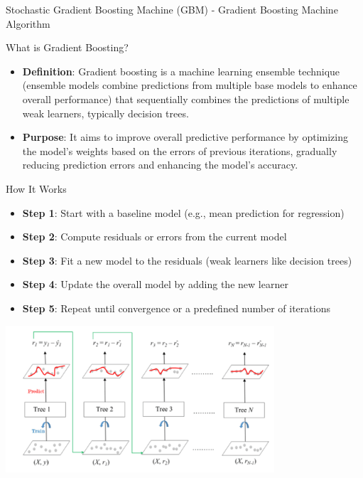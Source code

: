 \documentclass[
  ignorenonframetext,
]{beamer}
\providecommand{\tightlist}{%
  \setlength{\itemsep}{0pt}\setlength{\parskip}{0pt}}\usepackage{longtable,booktabs,array}
\begin{document}
\begin{frame}{Stochastic Gradient Boosting Machine (GBM) - Gradient
Boosting Machine Algorithm}
\label{stochastic-gradient-boosting-machine-gbm---gradient-boosting-machine-algorithm}
\end{frame}

\begin{frame}{What is Gradient Boosting?}
\label{what-is-gradient-boosting}
\begin{itemize}
\item
  \textbf{Definition}: Gradient boosting is a machine learning ensemble
  technique (ensemble models combine predictions from multiple base
  models to enhance overall performance) that sequentially combines the
  predictions of multiple weak learners, typically decision trees.
\item
  \textbf{Purpose}: It aims to improve overall predictive performance by
  optimizing the model's weights based on the errors of previous
  iterations, gradually reducing prediction errors and enhancing the
  model's accuracy.
\end{itemize}
\end{frame}

\begin{frame}{How It Works}
\label{how-it-works}
\begin{itemize}
\tightlist
\item
  \textbf{Step 1}: Start with a baseline model (e.g., mean prediction
  for regression)
\item
  \textbf{Step 2}: Compute residuals or errors from the current model
\item
  \textbf{Step 3}: Fit a new model to the residuals (weak learners like
  decision trees)
\item
  \textbf{Step 4}: Update the overall model by adding the new learner
\item
  \textbf{Step 5}: Repeat until convergence or a predefined number of
  iterations
\end{itemize}

\includegraphics[width=0.75\textwidth,height=\textheight]{gbm_visual.png}
\end{frame}
\end{document}
